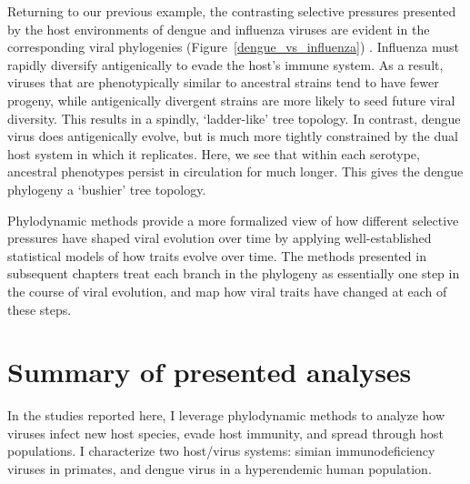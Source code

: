 Returning to our previous example, the contrasting selective pressures presented by the host environments of dengue and influenza viruses are evident in the corresponding viral phylogenies (Figure~\ref{dengue_vs_influenza}) \citep{volz2013viral,bedford2011strength}.
Influenza must rapidly diversify antigenically to evade the host's immune system.
As a result, viruses that are phenotypically similar to ancestral strains tend to have fewer progeny, while antigenically divergent strains are more likely to seed future viral diversity.
This results in a spindly, `ladder-like' tree topology.
In contrast, dengue virus does antigenically evolve, but is much more tightly constrained by the dual host system in which it replicates.
Here, we see that within each serotype, ancestral phenotypes persist in circulation for much longer.
This gives the dengue phylogeny a `bushier' tree topology.

Phylodynamic methods provide a more formalized view of how different selective pressures have shaped viral evolution over time by applying well-established statistical models of how traits evolve over time.
The methods presented in subsequent chapters treat each branch in the phylogeny as essentially one step in the course of viral evolution, and map how viral traits have changed at each of these steps.

\section{Summary of presented analyses}
In the studies reported here, I leverage phylodynamic methods to analyze how viruses infect new host species, evade host immunity, and spread through host populations.
I characterize two host/virus systems: simian immunodeficiency viruses in primates, and dengue virus in a hyperendemic human population.


